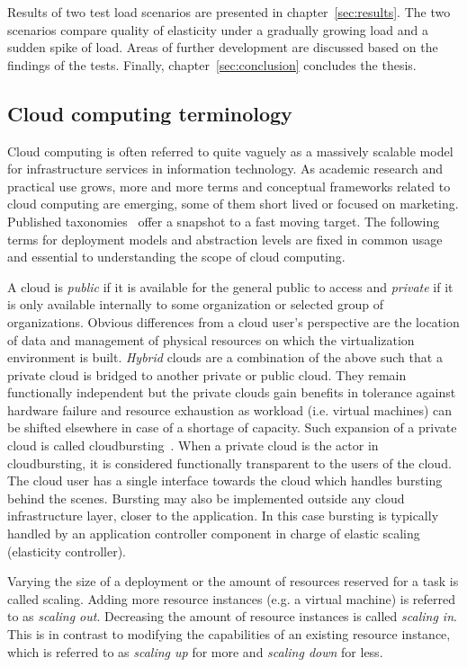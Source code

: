 \documentclass[english]{tktltiki2}
\theoremstyle{definition}
\theoremstyle{remark}
\begin{document}
Results of two test load scenarios are presented in chapter~\ref{sec:results}. The
two scenarios compare quality of elasticity under a gradually growing load and a
sudden spike of load. Areas of further development are discussed based on the
findings of the tests. Finally, chapter~\ref{sec:conclusion} concludes the thesis.

\subsection{Cloud computing terminology} Cloud computing
is often referred to quite vaguely as a massively scalable model for
infrastructure services in information technology. As academic research and
practical use grows, more and more terms and conceptual frameworks related to
cloud computing are emerging, some of them short lived or focused on marketing.
Published taxonomies~\cite{Hofer2011taxonomy} offer a snapshot to a fast moving
target. The following terms for deployment models and abstraction levels are
fixed in common usage~\cite{nistdefinition}~\cite{handbook} and essential to
understanding the scope of cloud computing.

A cloud is \emph{public} if it is available for the general public to access and
\emph{private} if it is only available internally to some organization or
selected group of organizations. Obvious differences from a cloud user’s
perspective are the location of data and management of physical resources on
which the virtualization environment is built. \emph{Hybrid} clouds are a
combination of the above such that a private cloud is bridged to another private
or public cloud. They remain functionally independent but the private clouds
gain benefits in tolerance against hardware failure and resource exhaustion as
workload (i.e. virtual machines) can be shifted elsewhere in case of a shortage
of capacity. Such expansion of a private cloud is called
cloudbursting~\cite{nistdefinition}. When a private cloud is the actor in
cloudbursting, it is considered functionally transparent to the users of the
cloud. The cloud user has a single interface towards the cloud which handles
bursting behind the scenes. Bursting may also be implemented outside any cloud
infrastructure layer, closer to the application. In this case bursting is
typically handled by an application controller component in charge of elastic
scaling (elasticity controller).

Varying the size of a deployment or the amount of resources reserved for a task is called scaling. Adding more resource instances (e.g. a virtual machine) is referred to as \textit{scaling out}. Decreasing the amount of resource instances is called \textit{scaling in}. This is in contrast to modifying the capabilities of an existing resource instance, which is referred to as \textit{scaling up} for more and \textit{scaling down} for less.
\end{document}
